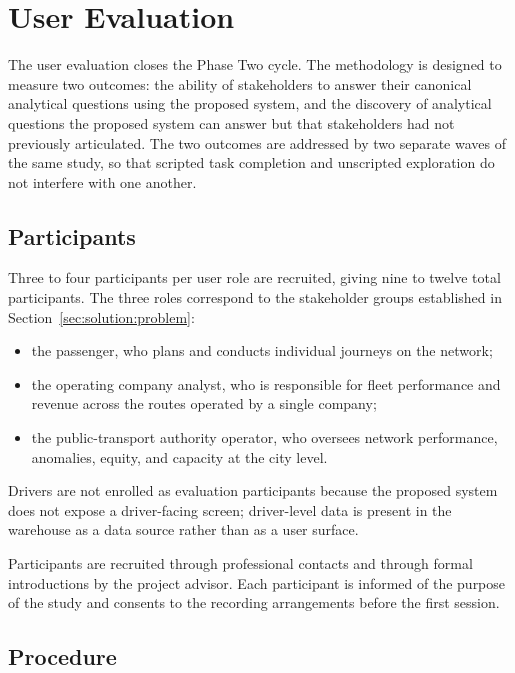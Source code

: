 \section{User Evaluation}
\label{sec:future:eval}

The user evaluation closes the Phase Two cycle. The methodology is designed
to measure two outcomes: the ability of stakeholders to answer their
canonical analytical questions using the proposed system, and the discovery
of analytical questions the proposed system can answer but that stakeholders
had not previously articulated. The two outcomes are addressed by two
separate waves of the same study, so that scripted task completion and
unscripted exploration do not interfere with one another.

\subsection{Participants}
\label{sec:future:eval:participants}

Three to four participants per user role are recruited, giving nine to
twelve total participants. The three roles correspond to the stakeholder
groups established in Section~\ref{sec:solution:problem}:

\begin{itemize}
  \item the passenger, who plans and conducts individual journeys on the
        network;
  \item the operating company analyst, who is responsible for fleet
        performance and revenue across the routes operated by a single
        company;
  \item the public-transport authority operator, who oversees network
        performance, anomalies, equity, and capacity at the city level.
\end{itemize}

Drivers are not enrolled as evaluation participants because the proposed
system does not expose a driver-facing screen; driver-level data is
present in the warehouse as a data source rather than as a user surface.

Participants are recruited through professional contacts and through formal
introductions by the project advisor. Each participant is informed of the
purpose of the study and consents to the recording arrangements before the
first session.

\subsection{Procedure}
\label{sec:future:eval:procedure}


